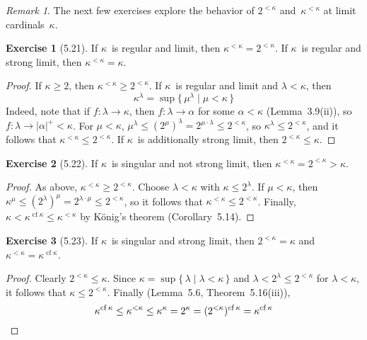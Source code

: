 \documentclass[letterpaper,12pt]{article}
\newcommand{\mult}{\cdot}
\DeclareMathOperator{\cf}{cf}
\newcommand{\csuc}[1]{#1^+}
\newcommand{\card}[1]{|#1|}
\theoremstyle{definition}
\newtheorem*{exer}{Exercise}
\theoremstyle{remark}
\newtheorem*{rmk}{Remark}
\begin{document}
\begin{rmk}
The next few exercises explore the behavior of \(2^{<\kappa}\) and~\(\kappa^{<\kappa}\) at limit cardinals~\(\kappa\).
\end{rmk}

\begin{exer}[5.21]
If \(\kappa\)~is regular and limit, then \(\kappa^{<\kappa}=2^{<\kappa}\). If \(\kappa\)~is regular and strong limit, then \(\kappa^{<\kappa}=\kappa\).
\end{exer}
\begin{proof}
If \(\kappa\ge2\), then \(\kappa^{<\kappa}\ge 2^{<\kappa}\). If \(\kappa\)~is regular and limit and \(\lambda<\kappa\), then
\[\kappa^{\lambda}=\sup\{\,\mu^{\lambda}\mid\mu<\kappa\,\}\]
Indeed, note that if \(f:\lambda\to\kappa\), then \(f:\lambda\to\alpha\) for some \(\alpha<\kappa\) (Lemma~3.9(ii)), so \(f:\lambda\to\csuc{\card{\alpha}}<\kappa\). For \(\mu<\kappa\), \(\mu^{\lambda}\le(2^{\mu})^{\lambda}=2^{\mu\mult\lambda}\le 2^{<\kappa}\), so \(\kappa^{\lambda}\le 2^{<\kappa}\), and it follows that \(\kappa^{<\kappa}\le 2^{<\kappa}\). If \(\kappa\)~is additionally strong limit, then \(2^{<\kappa}\le\kappa\).
\end{proof}

\begin{exer}[5.22]
If \(\kappa\)~is singular and not strong limit, then \(\kappa^{<\kappa}=2^{<\kappa}>\kappa\).
\end{exer}
\begin{proof}
As above, \(\kappa^{<\kappa}\ge 2^{<\kappa}\). Choose \(\lambda<\kappa\) with \(\kappa\le 2^{\lambda}\). If \(\mu<\kappa\), then \(\kappa^{\mu}\le(2^{\lambda})^{\mu}=2^{\lambda\mult\mu}\le 2^{<\kappa}\), so it follows that \(\kappa^{<\kappa}\le 2^{<\kappa}\). Finally, \(\kappa<\kappa^{\cf\kappa}\le\kappa^{<\kappa}\) by K\"onig's theorem (Corollary~5.14).
\end{proof}

\begin{exer}[5.23]
If \(\kappa\)~is singular and strong limit, then \(2^{<\kappa}=\kappa\) and \(\kappa^{<\kappa}=\kappa^{\cf\kappa}\).
\end{exer}
\begin{proof}
Clearly \(2^{<\kappa}\le\kappa\). Since \(\kappa=\sup\{\,\lambda\mid\lambda<\kappa\,\}\) and \(\lambda<2^{\lambda}\le 2^{<\kappa}\) for \(\lambda<\kappa\), it follows that \(\kappa\le 2^{<\kappa}\). Finally (Lemma~5.6, Theorem~5.16(iii)),
\[\kappa^{\cf\kappa}\le\kappa^{<\kappa}\le\kappa^{\kappa}=2^{\kappa}=(2^{<\kappa})^{\cf\kappa}=\kappa^{\cf\kappa}\qedhere\]
\end{proof}
\end{document}
